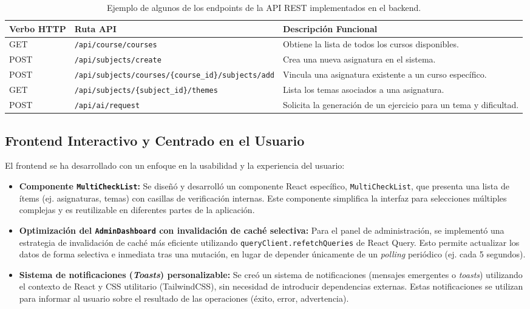 \begin{table}[H]
  \centering
  \begin{tabularx}{\linewidth}{@{} l l X @{}}
    \toprule
    \textbf{Verbo HTTP} & \textbf{Ruta API} & \textbf{Descripción Funcional} \\ 
    \midrule
    GET    & \texttt{/api/course/courses}                             & Obtiene la lista de todos los cursos disponibles. \\
    POST   & \texttt{/api/subjects/create}                            & Crea una nueva asignatura en el sistema. \\
    POST   & \texttt{/api/subjects/courses/\{course\_id\}/subjects/add}      & Vincula una asignatura existente a un curso específico. \\
    GET    & \texttt{/api/subjects/\{subject\_id\}/themes}     & Lista los temas asociados a una asignatura. \\
    POST   & \texttt{/api/ai/request}& Solicita la generación de un ejercicio para un tema y dificultad. \\
    \bottomrule
  \end{tabularx}
  \caption{Ejemplo de algunos de los endpoints de la API REST implementados en el backend.}
  \label{tab:endpoints_aportaciones}
\end{table}

\subsection{Frontend Interactivo y Centrado en el Usuario}
\label{ssec:frontend_aportaciones}

El frontend se ha desarrollado con un enfoque en la usabilidad y la experiencia del usuario:
\begin{itemize}[leftmargin=*]
  \item \textbf{Componente \texttt{MultiCheckList}:} Se diseñó y desarrolló un componente React específico, \texttt{MultiCheckList}, que presenta una lista de ítems (ej. asignaturas, temas) con casillas de verificación internas. Este componente simplifica la interfaz para selecciones múltiples complejas y es reutilizable en diferentes partes de la aplicación.
  \item \textbf{Optimización del \texttt{AdminDashboard} con invalidación de caché selectiva:} Para el panel de administración, se implementó una estrategia de invalidación de caché más eficiente utilizando \texttt{queryClient.refetchQueries} de React Query. Esto permite actualizar los datos de forma selectiva e inmediata tras una mutación, en lugar de depender únicamente de un \emph{polling} periódico (ej. cada 5 segundos).
  \item \textbf{Sistema de notificaciones (\emph{Toasts}) personalizable:} Se creó un sistema de notificaciones (mensajes emergentes o \emph{toasts}) utilizando el contexto de React y CSS utilitario (TailwindCSS), sin necesidad de introducir dependencias externas. Estas notificaciones se utilizan para informar al usuario sobre el resultado de las operaciones (éxito, error, advertencia).
\end{itemize}

